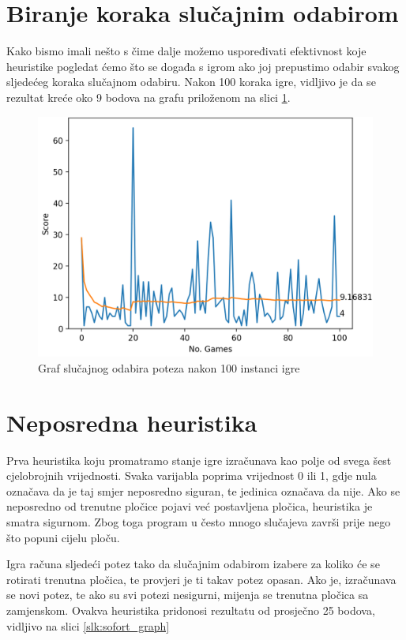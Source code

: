 \documentclass[zavrsnirad]{fer}
\begin{document}
\section{Biranje koraka slučajnim odabirom}
\label{pog:slucajan_odabir}

Kako bismo imali nešto s čime dalje možemo uspoređivati efektivnost koje heuristike pogledat ćemo što se događa s igrom ako joj prepustimo odabir svakog sljedećeg koraka slučajnom odabiru. Nakon 100 koraka igre, vidljivo je da se rezultat kreće oko 9 bodova na grafu priloženom na slici \ref{slk:random_graph}.


\begin{figure}[htb]
	\centering
	\includegraphics[width=0.58\linewidth]{Figures/random.png} 
	\caption{Graf slučajnog odabira poteza nakon 100 instanci igre}
	\label{slk:random_graph}
\end{figure}

\section{Neposredna heuristika}
\label{pog:neposredna}

Prva heuristika koju promatramo stanje igre izračunava kao polje od svega šest cjelobrojnih vrijednosti. Svaka varijabla poprima vrijednost 0 ili 1, gdje nula označava da je taj smjer neposredno siguran, te jedinica označava da nije. Ako se neposredno od trenutne pločice pojavi već postavljena pločica, heuristika je smatra sigurnom. Zbog toga program u često mnogo slučajeva završi prije nego što popuni cijelu ploču.

Igra računa sljedeći potez tako da slučajnim odabirom izabere za koliko će se rotirati trenutna pločica, te provjeri je ti takav potez opasan. Ako je, izračunava se novi potez, te ako su svi potezi nesigurni, mijenja se trenutna pločica sa zamjenskom. Ovakva heuristika pridonosi rezultatu od prosječno 25 bodova, vidljivo na slici \ref{slk:sofort_graph}
\end{document}
